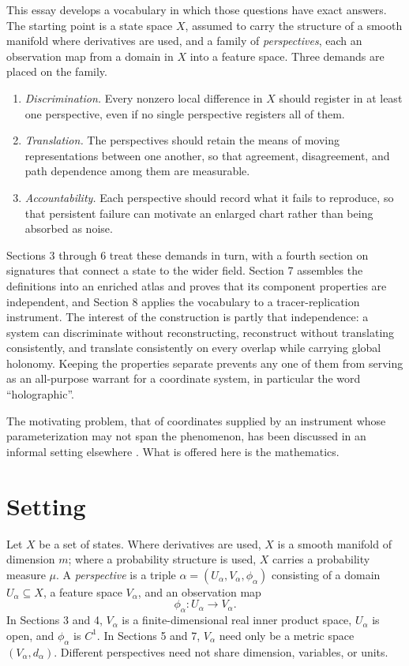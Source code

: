 \documentclass[11pt]{article}
\theoremstyle{remark}
\begin{document}
This essay develops a vocabulary in which those questions have exact answers. The starting point is a state space $X$, assumed to carry the structure of a smooth manifold where derivatives are used, and a family of \emph{perspectives}, each an observation map from a domain in $X$ into a feature space. Three demands are placed on the family.

\begin{enumerate}[label=(\roman*)]
\item \emph{Discrimination.} Every nonzero local difference in $X$ should register in at least one perspective, even if no single perspective registers all of them.
\item \emph{Translation.} The perspectives should retain the means of moving representations between one another, so that agreement, disagreement, and path dependence among them are measurable.
\item \emph{Accountability.} Each perspective should record what it fails to reproduce, so that persistent failure can motivate an enlarged chart rather than being absorbed as noise.
\end{enumerate}

Sections 3 through 6 treat these demands in turn, with a fourth section on signatures that connect a state to the wider field. Section 7 assembles the definitions into an enriched atlas and proves that its component properties are independent, and Section 8 applies the vocabulary to a tracer-replication instrument. The interest of the construction is partly that independence: a system can discriminate without reconstructing, reconstruct without translating consistently, and translate consistently on every overlap while carrying global holonomy. Keeping the properties separate prevents any one of them from serving as an all-purpose warrant for a coordinate system, in particular the word ``holographic''.

The motivating problem, that of coordinates supplied by an instrument whose parameterization may not span the phenomenon, has been discussed in an informal setting elsewhere \cite{flyxion}. What is offered here is the mathematics.

\section{Setting}

Let $X$ be a set of states. Where derivatives are used, $X$ is a smooth manifold of dimension $m$; where a probability structure is used, $X$ carries a probability measure $\mu$. A \emph{perspective} is a triple $\alpha=(U_\alpha,V_\alpha,\phi_\alpha)$ consisting of a domain $U_\alpha\subseteq X$, a feature space $V_\alpha$, and an observation map
\[
\phi_\alpha:U_\alpha\longrightarrow V_\alpha .
\]
In Sections 3 and 4, $V_\alpha$ is a finite-dimensional real inner product space, $U_\alpha$ is open, and $\phi_\alpha$ is $C^1$. In Sections 5 and 7, $V_\alpha$ need only be a metric space $(V_\alpha,d_\alpha)$. Different perspectives need not share dimension, variables, or units.
\end{document}
